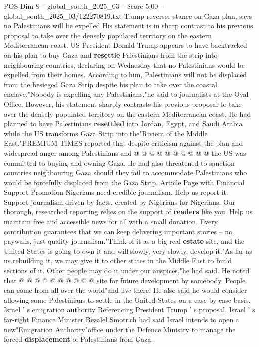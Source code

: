 \begin{textsample}{POS Dim 8 – global\_south\_2025\_03 – Score 5.00 – global\_south\_2025\_03/122270819.txt}  \label{ex:f8_pos_143}
Trump reverses stance on Gaza plan, says no Palestinians will be expelled His statement is in sharp contrast to his previous proposal to take over the densely populated territory on the eastern Mediterranean coast.
US President Donald Trump appears to have backtracked on his plan to buy Gaza and \textbf{resettle} Palestinians from the strip into neighbouring countries, declaring on Wednesday that no Palestinians would be expelled from their homes.
According to him, Palestinians will not be displaced from the besieged Gaza Strip despite his plan to take over the coastal enclave."Nobody is expelling any Palestinians,"he said to journalists at the Oval Office.
However, his statement sharply contrasts his previous proposal to take over the densely populated territory on the eastern Mediterranean coast.
He had planned to have Palestinians \textbf{resettled} into Jordan, Egypt, and Saudi Arabia while the US transforms Gaza Strip into the"Riviera of the Middle East."PREMIUM TIMES reported that despite criticism against the plan and widespread anger among Palestinians and @ @ @ @ @ @ @ @ @ @ the US was committed to buying and owning Gaza.
He had also threatened to sanction countries neighbouring Gaza should they fail to accommodate Palestinians who would be forcefully displaced from the Gaza Strip.
Article Page with Financial Support Promotion Nigerians need credible journalism.
Help us report it.
Support journalism driven by facts, created by Nigerians for Nigerians.
Our thorough, researched reporting relies on the support of \textbf{readers} like you.
Help us maintain free and accessible news for all with a small donation.
Every contribution guarantees that we can keep delivering important stories -- no paywalls, just quality journalism."Think of it as a big real \textbf{estate} site, and the United States is going to own it and will slowly, very slowly, develop it."As far as us rebuilding it, we may give it to other states in the Middle East to build sections of it.
Other people may do it under our auspices,"he had said.
He noted that @ @ @ @ @ @ @ @ @ @ site for future development by somebody.
People can come from all over the world"and live there.
He also said he would consider allowing some Palestinians to settle in the United States on a case-by-case basis.
Israel ' s emigration authority Referencing President Trump ' s proposal, Israel ' s far-right Finance Minister Bezalel Smotrich had said Israel intends to open a new"Emigration Authority"office under the Defence Ministry to manage the forced \textbf{displacement} of Palestinians from Gaza.

\end{textsample}
